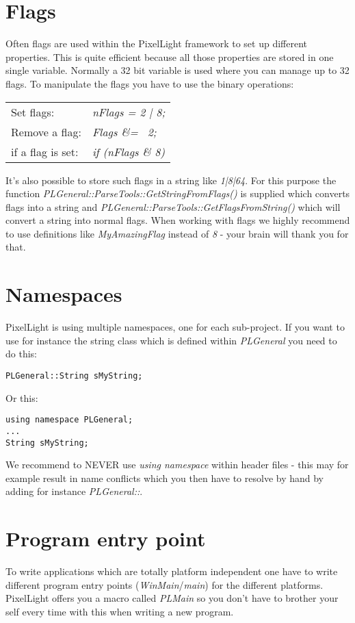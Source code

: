 \section{Flags}
Often flags are used within the PixelLight framework to set up different properties. This is quite efficient because all those properties are stored in one single variable. Normally a 32 bit variable is used where you can manage up to 32 flags. To manipulate the flags you have to use the binary operations:
\begin{tabular}{ll}
Set flags:&
  \emph{nFlags = 2 | 8;}\\
Remove a flag:&
  \emph{Flags \&= ~2;}\\
if a flag is set:&
  \emph{if (nFlags \& 8)}\\
\end{tabular}
It's also possible to store such flags in a string like \emph{1|8|64}. For this purpose the function \emph{PLGeneral::ParseTools::GetStringFromFlags()} is supplied which converts flags into a string and \emph{PLGeneral::ParseTools::GetFlagsFromString()} which will convert a string into normal flags. When working with flags we highly recommend to use definitions like \emph{MyAmazingFlag} instead of \emph{8} - your brain will thank you for that.




\section{Namespaces}
PixelLight is using multiple namespaces, one for each sub-project. If you want to use for instance the string class which is defined within \emph{PLGeneral} you need to do this:
\begin{lstlisting}[caption=Explicit namespace]
PLGeneral::String sMyString;
\end{lstlisting}
Or this:
\begin{lstlisting}[caption=Using namespace]
using namespace PLGeneral;
...
String sMyString;
\end{lstlisting}
We recommend to NEVER use \emph{using namespace} within header files - this may for example result in name conflicts which you then have to resolve by hand by adding for instance \emph{PLGeneral::}.




\section{Program entry point}
To write applications which are totally platform independent one have to write different program entry points (\emph{WinMain}/\emph{main}) for the different platforms. PixelLight offers you a macro called \emph{PLMain} so you don't have to brother your self every time with this when writing a new program.

